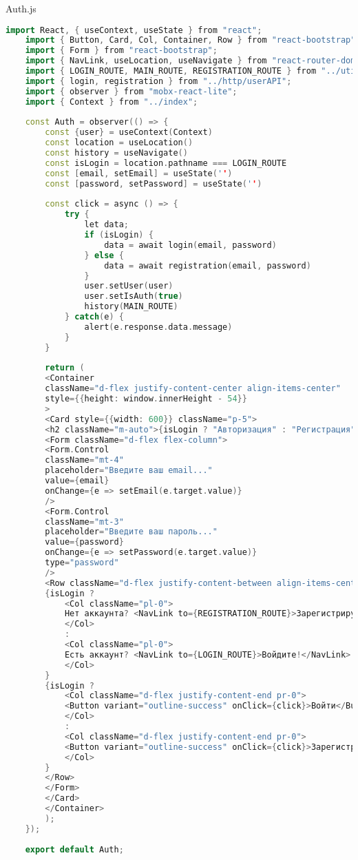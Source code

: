 Auth.js
\begin{lstlisting}[language=C++]
	import React, { useContext, useState } from "react";
	import { Button, Card, Col, Container, Row } from "react-bootstrap";
	import { Form } from "react-bootstrap";
	import { NavLink, useLocation, useNavigate } from "react-router-dom";
	import { LOGIN_ROUTE, MAIN_ROUTE, REGISTRATION_ROUTE } from "../utils/consts";
	import { login, registration } from "../http/userAPI";
	import { observer } from "mobx-react-lite";
	import { Context } from "../index";
	
	const Auth = observer(() => {
		const {user} = useContext(Context)
		const location = useLocation()
		const history = useNavigate()
		const isLogin = location.pathname === LOGIN_ROUTE
		const [email, setEmail] = useState('')
		const [password, setPassword] = useState('')
		
		const click = async () => {
			try {
				let data;
				if (isLogin) {
					data = await login(email, password)
				} else {
					data = await registration(email, password)
				}
				user.setUser(user)
				user.setIsAuth(true)
				history(MAIN_ROUTE)
			} catch(e) {
				alert(e.response.data.message)
			}
		}
		
		return (
		<Container 
		className="d-flex justify-content-center align-items-center"
		style={{height: window.innerHeight - 54}}
		>
		<Card style={{width: 600}} className="p-5">
		<h2 className="m-auto">{isLogin ? "Авторизация" : "Регистрация"}</h2>
		<Form className="d-flex flex-column">
		<Form.Control
		className="mt-4"
		placeholder="Введите ваш email..."
		value={email}
		onChange={e => setEmail(e.target.value)}
		/>
		<Form.Control
		className="mt-3"
		placeholder="Введите ваш пароль..."
		value={password}
		onChange={e => setPassword(e.target.value)}
		type="password"
		/>
		<Row className="d-flex justify-content-between align-items-center mt-3">
		{isLogin ? 
			<Col className="pl-0">
			Нет аккаунта? <NavLink to={REGISTRATION_ROUTE}>Зарегистрируйтесь!</NavLink>
			</Col>
			:
			<Col className="pl-0">
			Есть аккаунт? <NavLink to={LOGIN_ROUTE}>Войдите!</NavLink>
			</Col>
		}
		{isLogin ? 
			<Col className="d-flex justify-content-end pr-0">
			<Button variant="outline-success" onClick={click}>Войти</Button>
			</Col>
			:
			<Col className="d-flex justify-content-end pr-0">
			<Button variant="outline-success" onClick={click}>Зарегистрироваться</Button>
			</Col>
		}
		</Row>
		</Form>
		</Card>
		</Container>
		);
	});
	
	export default Auth;
\end{lstlisting}

